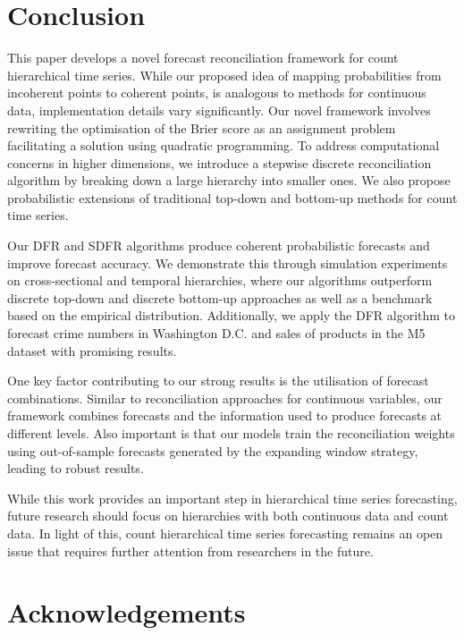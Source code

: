 \documentclass[a4paper,review,12pt,authoryear]{elsarticle}
\theoremstyle{definition}
\begin{document}
     \section{Conclusion}
     \label{sec:conclusion}

     This paper develops a novel forecast reconciliation framework for count hierarchical time series.
     While our proposed idea of mapping probabilities from incoherent points to coherent points, is analogous to methods for continuous data, implementation details vary significantly.
     Our novel framework involves rewriting the optimisation of the Brier score as an assignment problem facilitating a solution using quadratic programming. 
     To address computational concerns in higher dimensions, we introduce a stepwise discrete reconciliation algorithm by breaking down a large hierarchy into smaller ones.
     We also propose probabilistic extensions of traditional top-down and bottom-up methods for count time series.

     Our DFR and SDFR algorithms produce coherent probabilistic forecasts and improve forecast accuracy.
     We demonstrate this through simulation experiments on cross-sectional and temporal hierarchies, where our algorithms outperform discrete top-down and discrete bottom-up approaches as well as a benchmark based on the empirical distribution. Additionally, we apply the DFR algorithm to forecast crime numbers in Washington D.C. and sales of products in the M5 dataset with promising results.
     
     One key factor contributing to our strong results is the utilisation of forecast combinations.
     Similar to reconciliation approaches for continuous variables, our framework combines forecasts and the information used to produce forecasts at different levels.
     Also important is that our models train the reconciliation weights using out-of-sample forecasts generated by the expanding window strategy, leading to robust results.


     While this work provides an important step in hierarchical time series forecasting, future research should focus on hierarchies with both continuous data and count data. In light of this, count hierarchical time series forecasting remains an open issue that requires further attention from researchers in the future.

\section*{Acknowledgements}
\end{document}
